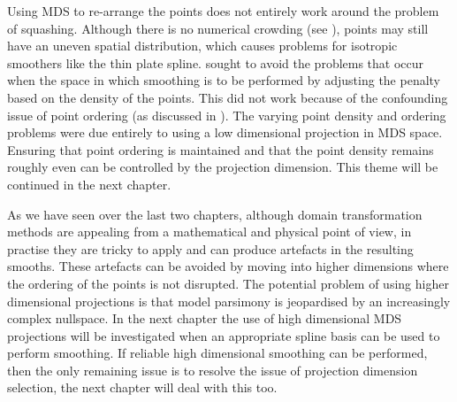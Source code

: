 Using MDS to re-arrange the points does not entirely work around the problem of squashing. Although there is no numerical crowding (see ), points may still have an uneven spatial distribution, which causes problems for isotropic smoothers like the thin plate spline.  sought to avoid the problems that occur when the space in which smoothing is to be performed by adjusting the penalty based on the density of the points. This did not work because of the confounding issue of point ordering (as discussed in ). The varying point density and ordering problems were due entirely to using a low dimensional projection in MDS space. Ensuring that point ordering is maintained and that the point density remains roughly even can be controlled by the projection dimension. This theme will be continued in the next chapter.

As we have seen over the last two chapters, although domain transformation methods are appealing from a mathematical and physical point of view, in practise they are tricky to apply and can produce artefacts in the resulting smooths. These artefacts can be avoided by moving into higher dimensions where the ordering of the points is not disrupted. The potential problem of using higher dimensional projections is that model parsimony is jeopardised by an increasingly complex nullspace. In the next chapter the use of high dimensional MDS projections will be investigated when an appropriate spline basis can be used to perform smoothing. If reliable high dimensional smoothing can be performed, then the only remaining issue is to resolve the issue of projection dimension selection, the next chapter will deal with this too.
